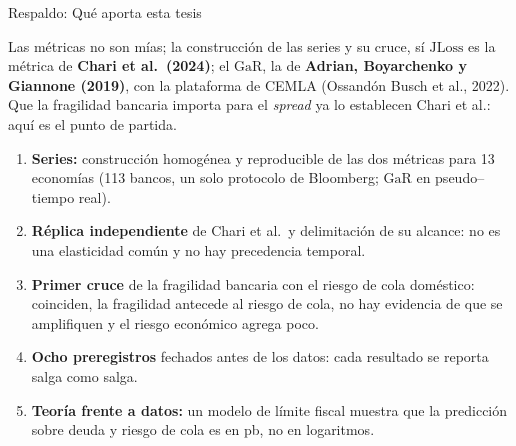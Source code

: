 \documentclass[aspectratio=169]{beamer}
\newcommand{\JLoss}{\mathrm{JLoss}}
\newcommand{\GaR}{\mathrm{GaR}}
\begin{document}
\begin{frame}{Respaldo: Qué aporta esta tesis}
\small
\begin{block}{Las métricas no son mías; la construcción de las series y su cruce, sí}
\footnotesize $\JLoss$ es la métrica de \textbf{Chari et al.\ (2024)}; el $\GaR$, la de \textbf{Adrian, Boyarchenko y Giannone (2019)}, con la plataforma de CEMLA (Ossandón Busch et al., 2022). Que la fragilidad bancaria importa para el \textit{spread} ya lo establecen Chari et al.: aquí es el punto de partida.
\end{block}
\begin{enumerate}\setlength\itemsep{2pt}
\item \textbf{Series:} construcción homogénea y reproducible de las dos métricas para 13 economías (113 bancos, un solo protocolo de Bloomberg; $\GaR$ en pseudo--tiempo real).
\item \textbf{Réplica independiente} de Chari et al.\ y delimitación de su alcance: no es una elasticidad común y no hay precedencia temporal.
\item \textbf{Primer cruce} de la fragilidad bancaria con el riesgo de cola doméstico: coinciden, la fragilidad antecede al riesgo de cola, no hay evidencia de que se amplifiquen y el riesgo económico agrega poco.
\item \textbf{Ocho preregistros} fechados antes de los datos: cada resultado se reporta salga como salga.
\item \textbf{Teoría frente a datos:} un modelo de límite fiscal muestra que la predicción sobre deuda y riesgo de cola es en pb, no en logaritmos.
\end{enumerate}
\end{frame}
\end{document}
